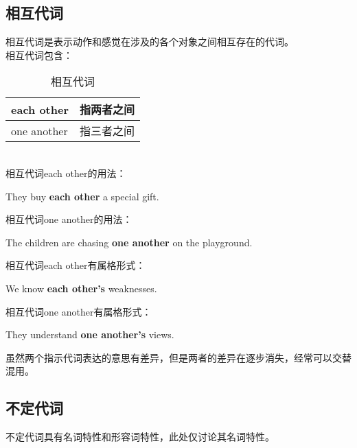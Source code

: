 \documentclass[UTF8]{ctexart}
\newcommand{\littf}[1]{{\hspace{3pt}\ttfamily #1}}
\begin{document}
\subsection{相互代词}
    相互代词是表示动作和感觉在涉及的各个对象之间相互存在的代词。\\[3mm]
    相互代词包含：
    \begin{table}[h]
        \begin{center}
            \ttfamily
            \begin{tabular}{p{70pt}|p{70pt}}
                \hline
                each other&指两者之间\\ \hline
                one another&指三者之间\\ \hline
            \end{tabular}
            \rmfamily
            \caption{相互代词}
        \end{center}
    \end{table}\\
    相互代词\littf{each other\hphantom{x}}的用法：
    \begin{center}
        \large\ttfamily
        They buy \textbf{each other} a special gift.\\[6mm]
    \end{center}
    相互代词\littf{one another}的用法：
    \begin{center}
        \large\ttfamily
        The children are chasing \textbf{one another} on the playground.\\[6mm]
    \end{center}
    相互代词\littf{each other\hphantom{x}}有属格形式：
    \begin{center}
        \large\ttfamily
        We know \textbf{each other's} weaknesses.\\[6mm]
    \end{center}
    相互代词\littf{one another}有属格形式：
    \begin{center}
        \large\ttfamily
        They understand \textbf{one another's} views.\\[6mm]
    \end{center}
    虽然两个指示代词表达的意思有差异，但是两者的差异在逐步消失，经常可以交替混用。

\newpage

\subsection{不定代词}
    不定代词具有名词特性和形容词特性，此处仅讨论其名词特性。
\end{document}

